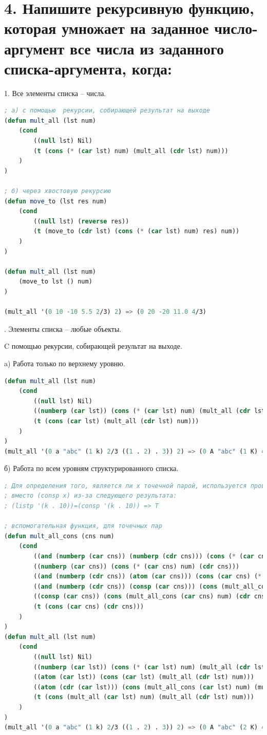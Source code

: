 \documentclass[12pt]{report}
\begin{document}
\section*{4. Напишите рекурсивную функцию, которая умножает на заданное число-аргумент все числа из заданного списка-аргумента, когда:}

1. Все элементы списка -- числа.
\begin{lstlisting}[language=Lisp]
; а) с помощью  рекурсии, собирающей результат на выходе
(defun mult_all (lst num)
	(cond
		((null lst) Nil)
		(t (cons (* (car lst) num) (mult_all (cdr lst) num)))
	)
)

; б) через хвостовую рекурсию
(defun move_to (lst res num)
	(cond
		((null lst) (reverse res))
		(t (move_to (cdr lst) (cons (* (car lst) num) res) num))
	)
)

(defun mult_all (lst num)
	(move_to lst () num)
)

(mult_all '(0 10 -10 5.5 2/3) 2) => (0 20 -20 11.0 4/3)
\end{lstlisting}

. Элементы списка -- любые объекты. 

C помощью  рекурсии, собирающей результат на выходе. 

a) Работа только по верхнему уровню.
\begin{lstlisting}[language=Lisp]
(defun mult_all (lst num)
	(cond 
		((null lst) Nil)
		((numberp (car lst)) (cons (* (car lst) num) (mult_all (cdr lst) num)))
		(t (cons (car lst) (mult_all (cdr lst) num)))
	)
)	
(mult_all '(0 a "abc" (1 k) 2/3 ((1 . 2) . 3)) 2) => (0 A "abc" (1 K) 4/3 ((1 . 2) . 3))
\end{lstlisting}

б) Работа по всем уровням структурированного списка.
\begin{lstlisting}[language=Lisp]
; Для определения того, является ли x точечной парой, используется проверка (atom (cdr x)) 
; вместо (consp x) из-за следующего результата:
; (listp '(k . 10))=(consp '(k . 10)) => T

; вспомогательная функция, для точечных пар
(defun mult_all_cons (cns num)
	(cond 
		((and (numberp (car cns)) (numberp (cdr cns))) (cons (* (car cns) num) (* (cdr cns) num)))
		((numberp (car cns)) (cons (* (car cns) num) (cdr cns)))
		((and (numberp (cdr cns)) (atom (car cns))) (cons (car cns) (* (cdr cns) num)))
		((and (numberp (cdr cns)) (consp (car cns))) (cons (mult_all_cons (car cns) num) (* (cdr cns) num)))
		((consp (car cns)) (cons (mult_all_cons (car cns) num) (cdr cns)))
		(t (cons (car cns) (cdr cns)))
	)
)
(defun mult_all (lst num)
	(cond 
		((null lst) Nil)
		((numberp (car lst)) (cons (* (car lst) num) (mult_all (cdr lst) num)))
		((atom (car lst)) (cons (car lst) (mult_all (cdr lst) num)))
		((atom (cdr (car lst))) (cons (mult_all_cons (car lst) num) (mult_all (cdr lst) num)))
		(t (cons (mult_all (car lst) num) (mult_all (cdr lst) num)))
	)
)		
(mult_all '(0 a "abc" (1 k) 2/3 ((1 . 2) . 3)) 2) => (0 A "abc" (2 K) 4/3 ((2 . 4) . 6))
\end{lstlisting}
\end{document}
